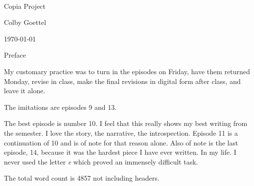 \documentclass[11pt]{article}
\begin{document}
\begin{titlepage}
    \begin{center}
        ~
        
        \vspace{5em}
        
        {\Huge Copia Project}
        
        \vfill
        
        {\Large Colby Goettel}
        
        \vspace{1.5em}
        
        \today
    \end{center}
\end{titlepage}

\begin{center}
    {\large Preface}
\end{center}

\thispagestyle{empty}My customary practice was to turn in the episodes on Friday, have them returned Monday, revise in class, make the final revisions in digital form after class, and leave it alone.

The imitations are episodes 9 and 13.

The best episode is number 10. I feel that this really shows my best writing from the semester. I love the story, the narrative, the introspection. Episode 11 is a continuation of 10 and is of note for that reason alone. Also of note is the last episode, 14, because it was the hardest piece I have ever written. In my life. I never used the letter \textit{e} which proved an immensely difficult task.

The total word count is 4857 not including headers.
\end{document}
